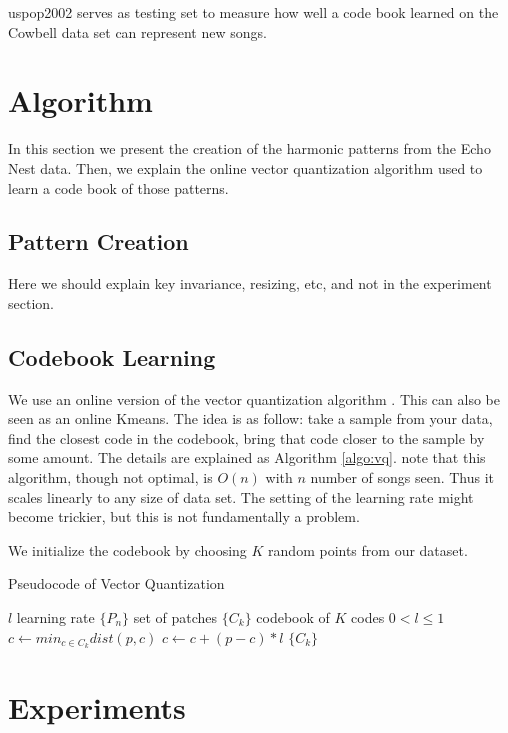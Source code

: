 \documentclass{article}
\begin{document}
uspop2002 serves as testing set to measure how well a code book learned on
the Cowbell data set can represent new songs.

\section{Algorithm}\label{sec:algo}
In this section we present the creation of the harmonic patterns from
the Echo Nest data. Then, we explain the online vector quantization algorithm
used to learn a code book of those patterns.

\subsection{Pattern Creation}
Here we should explain key invariance, resizing, etc, and not in the
experiment section.


\subsection{Codebook Learning}
We use an online version of the vector quantization algorithm 
\cite{Gersho1991}. This can also be seen as an online Kmeans.
The idea is as follow: take a sample from your data, find the closest
code in the codebook, bring that code closer to the sample by some amount.
The details are explained as Algorithm \ref{algo:vq}. note that this
algorithm, though not optimal, is $O(n)$ with $n$ number of songs seen.
Thus it scales linearly to any size of data set. The setting of the learning
rate might become trickier, but this is not fundamentally a problem.


We initialize the codebook by choosing $K$ random points from our dataset.


\begin{algorithm}
\caption{Pseudocode of Vector Quantization}
\label{algo:vq}
\begin{algorithmic}
\STATE$l$ learning rate
\STATE$\{P_n\}$ set of patches
\STATE$\{C_k\}$ codebook of $K$ codes
\REQUIRE $0 < l \leq 1$
\STATE$c \leftarrow min_{c \in C_k} dist(p,c)$
\STATE$c \leftarrow c + (p - c) * l$
\ENDFOR
\ENDFOR
\RETURN $\{C_k\}$
\end{algorithmic}
\end{algorithm}






\section{Experiments}\label{sec:experiments}
\end{document}
